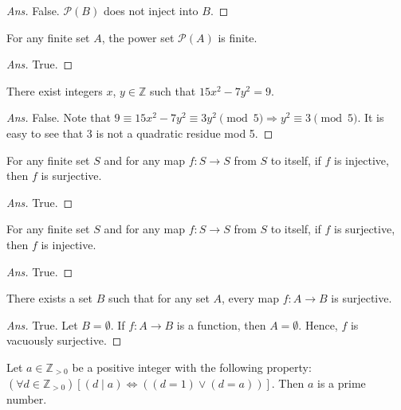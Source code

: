 \documentclass[12pt]{article}
\newenvironment{problem}[2][Problem]{\begin{trivlist}
\item[\hskip \labelsep {\bfseries #1}\hskip \labelsep {\bfseries #2.}]}{\end{trivlist}}
\begin{document}
\begin{proof}[Ans]
False. $\mathcal{P}(B)$ does not inject into $B$.
\end{proof}

\begin{problem}{11}
For any finite set $A$, the power set $\mathcal{P}(A)$ is finite.
\end{problem}

\begin{proof}[Ans]
True.
\end{proof}

\begin{problem}{12}
There exist integers $x$, $y \in \mathbb{Z}$ such that $15x^2 - 7y^2 = 9$.
\end{problem}

\begin{proof}[Ans]
False. Note that $9 \equiv 15x^2 - 7y^2 \equiv 3y^2 \pmod{5} \Rightarrow y^2 \equiv 3 \pmod{5}$. It is easy to see that $3$ is not a quadratic residue mod 5. 
\end{proof}

\begin{problem}{13}
For any finite set $S$ and for any map $f : S \rightarrow S$ from $S$ to itself,
if $f$ is injective, then $f$ is surjective.
\end{problem}

\begin{proof}[Ans]
True.
\end{proof}

\begin{problem}{14}
For any finite set $S$ and for any map $f : S \rightarrow S$ from $S$ to itself,
if $f$ is surjective, then $f$ is injective.
\end{problem}

\begin{proof}[Ans]
True.
\end{proof}

\begin{problem}{15}
There exists a set $B$ such that for any set $A$,
every map $f : A \rightarrow B$ is surjective.
\end{problem}

\begin{proof}[Ans]
True. Let $B = \emptyset$. If $f : A \to B$ is a function, then $A = \emptyset$. Hence, $f$ is vacuously surjective.
\end{proof}

\begin{problem}{16}
Let $a \in \mathbb{Z}_{>0}$ be a positive integer with the following property:\newline
$(\forall d \in \mathbb{Z}_{>0}) \left[(d \mid a) \Leftrightarrow
((d = 1) \lor (d = a)) \right]$. Then $a$ is a prime number.
\end{problem}
\end{document}
